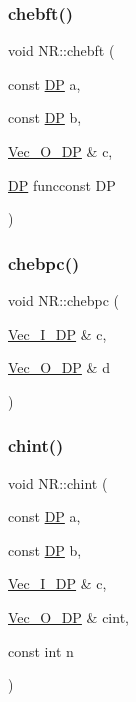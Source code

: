 \subsubsection{\texorpdfstring{chebft()}{chebft()}}
{\footnotesize\ttfamily void N\+R\+::chebft (\begin{DoxyParamCaption}\item[{const \mbox{\hyperlink{namespaceNR_af6ff762dd605ff477b8e52387253a02a}{DP}}}]{a,  }\item[{const \mbox{\hyperlink{namespaceNR_af6ff762dd605ff477b8e52387253a02a}{DP}}}]{b,  }\item[{\mbox{\hyperlink{namespaceNR_a970094d23441f8ef6a45282a7eb2103d}{Vec\+\_\+\+O\+\_\+\+DP}} \&}]{c,  }\item[{\mbox{\hyperlink{namespaceNR_af6ff762dd605ff477b8e52387253a02a}{DP}} }]{funcconst DP }\end{DoxyParamCaption})}

\mbox{\label{namespaceNR_a76a061d807150f37b176e040ce5c93c4}} 
\subsubsection{\texorpdfstring{chebpc()}{chebpc()}}
{\footnotesize\ttfamily void N\+R\+::chebpc (\begin{DoxyParamCaption}\item[{\mbox{\hyperlink{namespaceNR_a9f943da53862537c552e2a770cb170ae}{Vec\+\_\+\+I\+\_\+\+DP}} \&}]{c,  }\item[{\mbox{\hyperlink{namespaceNR_a970094d23441f8ef6a45282a7eb2103d}{Vec\+\_\+\+O\+\_\+\+DP}} \&}]{d }\end{DoxyParamCaption})}

\mbox{\label{namespaceNR_a5d3b77d2ac43628be77688f9cf398473}} 
\subsubsection{\texorpdfstring{chint()}{chint()}}
{\footnotesize\ttfamily void N\+R\+::chint (\begin{DoxyParamCaption}\item[{const \mbox{\hyperlink{namespaceNR_af6ff762dd605ff477b8e52387253a02a}{DP}}}]{a,  }\item[{const \mbox{\hyperlink{namespaceNR_af6ff762dd605ff477b8e52387253a02a}{DP}}}]{b,  }\item[{\mbox{\hyperlink{namespaceNR_a9f943da53862537c552e2a770cb170ae}{Vec\+\_\+\+I\+\_\+\+DP}} \&}]{c,  }\item[{\mbox{\hyperlink{namespaceNR_a970094d23441f8ef6a45282a7eb2103d}{Vec\+\_\+\+O\+\_\+\+DP}} \&}]{cint,  }\item[{const int}]{n }\end{DoxyParamCaption})}

